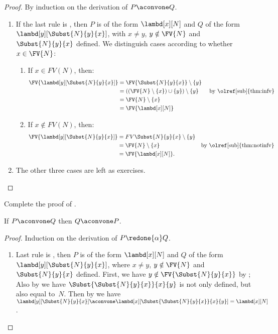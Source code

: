 \documentclass[../../../include/open-logic-section]{subfiles}
\begin{document}
\begin{proof}
  By induction on the derivation of $P \aconvone Q$.
  \begin{enumerate}
  \item If the last rule is , then $P$ is of the
    form $\lambd[x][N]$ and $Q$ of the form
    $\lambd[y][\Subst{N}{y}{x}]$, with $x \neq y$, $y \notin \FV{N}$
    and $\Subst{N}{y}{x}$ defined. We distinguish cases according to
    whether $x \in \FV{N}$:
    \begin{enumerate}
    \item If $x \in FV(N)$, then:
      \begin{align*}
        \FV{\lambd[y][\Subst{N}{y}{x}]} &=
        \FV{\Subst{N}{y}{x}} \setminus \{y\} \\
        & = ((\FV{N} \setminus \{x\}) \cup \{y\}) \setminus \{y\}
         && \text{ by \olref[sub]{thm:infv}} \\
        & = \FV{N} \setminus \{x\} \\
        & = \FV{\lambd[x][N]}
      \end{align*}
    \item If $x \notin FV(N)$, then:
      \begin{align*}
        \FV{\lambd[y][\Subst{N}{y}{x}]}
        & = FV{\Subst{N}{y}{x}} \setminus \{y\} \\
        & = \FV{N} \setminus \{x\}
         && \text{by \olref[sub]{thm:notinfv}} \\
        & = \FV{\lambd[x][N]}.
      \end{align*}
    \end{enumerate}
  \item The other three cases are left as exercises. 
  \end{enumerate}
\end{proof}

\begin{prob}
  Complete the proof of .
\end{prob}

\begin{lem}
  If $P \aconvone Q$ then $Q \aconvone P$.
\end{lem}

\begin{proof}
  Induction on the derivation of $P \redone{\alpha} Q$.
  \begin{enumerate}
  \item Last rule is , then $P$ is of the form
    $\lambd[x][N]$ and $Q$ of the form
    $\lambd[y][\Subst{N}{y}{x}]$, where $x \neq y$, $y \notin \FV{N}$ and
    $\Subst{N}{y}{x}$ defined. First, we have $y \notin
    \FV{\Subst{N}{y}{x}}$ by ; Also 
    by  we have
    $\Subst{\Subst{N}{y}{x}}{x}{y}$ is not only defined, but
    also equal to~$N$. Then by  we have
    $\lambd[y][\Subst{N}{y}{x}] \aconvone
    \lambd[x][\Subst{\Subst{N}{y}{x}}{x}{y}] = \lambd[x][N]$.
  \end{enumerate}
\end{proof}
\end{document}

